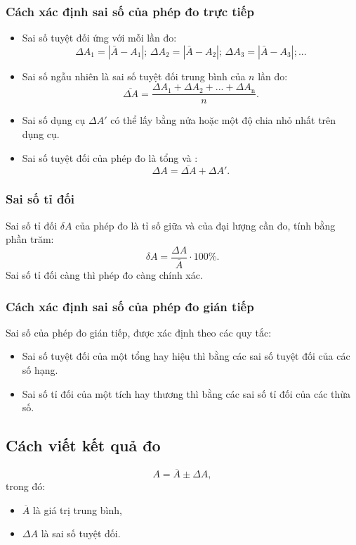 \subsubsection{Cách xác định sai số của phép đo trực tiếp}
\begin{itemize}
	\item Sai số tuyệt đối ứng với mỗi lần đo:
	$$\Delta A_1=|\bar{A}-A_1|;\,\Delta A_2=|\bar{A}-A_2|;\,\Delta A_3=|\bar{A}-A_3|;...$$
	\item Sai số ngẫu nhiên là sai số tuyệt đối trung bình của $n$ lần đo:
	$$\overline{\Delta A}=\dfrac{\Delta A_1+\Delta A_2+...+\Delta A_{\textrm{n}} }{n}.$$
	\item Sai số dụng cụ $\Delta A'$ có thể lấy bằng nửa hoặc một độ chia nhỏ nhất trên dụng cụ.
	\item Sai số tuyệt đối của phép đo là tổng  và :
	$$\Delta A= \overline{\Delta A}+ \Delta A'.$$
\end{itemize}
\subsubsection{Sai số tỉ đối}
Sai số tỉ đối $\delta A$ của phép đo là tỉ số giữa  và  của đại lượng cần đo, tính bằng phần trăm:
$$\delta A=\dfrac{\Delta A}{\overline A}\cdot 100\%.$$
Sai số tỉ đối càng  thì phép đo càng chính xác.

\subsubsection{Cách xác định sai số của phép đo gián tiếp}
Sai số của phép đo gián tiếp, được xác định theo các quy tắc:
\begin{itemize}
\item Sai số tuyệt đối của một tổng hay hiệu thì bằng  các sai số tuyệt đối của các số hạng.
\item Sai số tỉ đối của một tích hay thương thì bằng  các sai số tỉ đối của các thừa số. 
\end{itemize}
\subsection{Cách viết kết quả đo}
$$A=\overline{A} \pm \Delta A,$$
trong đó:
\begin{itemize}
	\item $\overline A$ là giá trị trung bình,
	\item $\Delta A$ là sai số tuyệt đối. 
\end{itemize}

